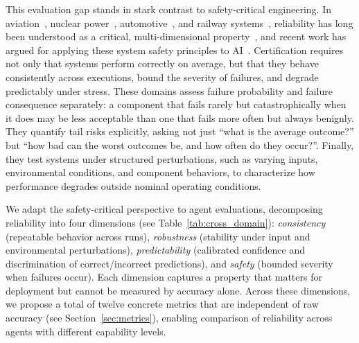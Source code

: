 \documentclass[11pt]{article}
\newcounter{dimension}
\begin{document}
This evaluation gap stands in stark contrast to safety-critical engineering.
In aviation~\citep{saearp4761, do178c}, nuclear power~\citep{iec61513}, automotive~\citep{iso26262}, and railway systems~\citep{en50126}, reliability has long been understood as a critical, multi-dimensional property~\citep{IEC61508, avizienis2004basic, laprie1992dependability}, and recent work has argued for applying these system safety principles to AI~\citep{dobbe2022system, raji2023concrete}.
Certification requires not only that systems perform correctly on average, but that they behave consistently across executions, bound the severity of failures, and degrade predictably under stress.
These domains assess failure probability and failure consequence separately: a component that fails rarely but catastrophically when it does may be less acceptable than one that fails more often but always benignly.
They quantify tail risks explicitly, asking not just ``what is the average outcome?'' but ``how bad can the worst outcomes be, and how often do they occur?''.
Finally, they test systems under structured perturbations, such as varying inputs, environmental conditions, and component behaviors, to characterize how performance degrades outside nominal operating conditions.

We adapt the safety-critical perspective to agent evaluations, decomposing reliability into four dimensions (see Table~\ref{tab:cross_domain}): \emph{consistency} (repeatable behavior across runs), \emph{robustness} (stability under input and environmental perturbations), \emph{predictability} (calibrated confidence and discrimination of correct/incorrect predictions), and \emph{safety} (bounded severity when failures occur).
Each dimension captures a property that matters for deployment but cannot be measured by accuracy alone.
Across these dimensions, we propose a total of twelve concrete metrics that are independent of raw accuracy (see Section~\ref{sec:metrics}), enabling comparison of reliability across agents with different capability levels.
\end{document}
